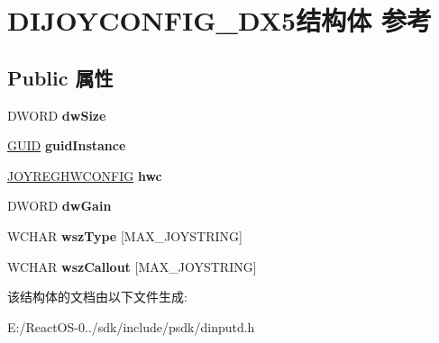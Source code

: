 \hypertarget{struct_d_i_j_o_y_c_o_n_f_i_g___d_x5}{}\section{D\+I\+J\+O\+Y\+C\+O\+N\+F\+I\+G\+\_\+\+D\+X5结构体 参考}
\label{struct_d_i_j_o_y_c_o_n_f_i_g___d_x5}
\subsection*{Public 属性}
\begin{DoxyCompactItemize}
\item 
\mbox{\label{struct_d_i_j_o_y_c_o_n_f_i_g___d_x5_a87e7bee5bd253e3236e57f6f102e41cc}} 
D\+W\+O\+RD {\bfseries dw\+Size}
\item 
\mbox{\label{struct_d_i_j_o_y_c_o_n_f_i_g___d_x5_ad168d456bbabd25c91df3718deb00cef}} 
\hyperlink{interface_g_u_i_d}{G\+U\+ID} {\bfseries guid\+Instance}
\item 
\mbox{\label{struct_d_i_j_o_y_c_o_n_f_i_g___d_x5_a3152de67942d85c0e202c295e131384d}} 
\hyperlink{structjoyreghwconfig__tag}{J\+O\+Y\+R\+E\+G\+H\+W\+C\+O\+N\+F\+IG} {\bfseries hwc}
\item 
\mbox{\label{struct_d_i_j_o_y_c_o_n_f_i_g___d_x5_a1aead725479f43f75ffd3fd48efc5997}} 
D\+W\+O\+RD {\bfseries dw\+Gain}
\item 
\mbox{\label{struct_d_i_j_o_y_c_o_n_f_i_g___d_x5_a25836c2839bcda2da535d0fd6be3f865}} 
W\+C\+H\+AR {\bfseries wsz\+Type} \mbox{[}M\+A\+X\+\_\+\+J\+O\+Y\+S\+T\+R\+I\+NG\mbox{]}
\item 
\mbox{\label{struct_d_i_j_o_y_c_o_n_f_i_g___d_x5_accd599f2fd56c746da6bc0f5378b64d0}} 
W\+C\+H\+AR {\bfseries wsz\+Callout} \mbox{[}M\+A\+X\+\_\+\+J\+O\+Y\+S\+T\+R\+I\+NG\mbox{]}
\end{DoxyCompactItemize}


该结构体的文档由以下文件生成\+:\begin{DoxyCompactItemize}
\item 
E\+:/\+React\+O\+S-\/0../sdk/include/psdk/dinputd.\+h\end{DoxyCompactItemize}
